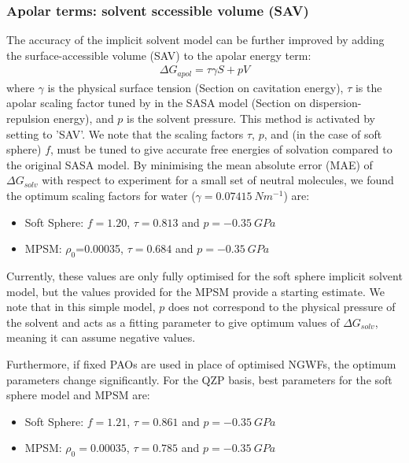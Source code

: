 \documentclass[letterpaper,10pt,english]{sphinxmanual}
\begin{document}
\subsubsection{Apolar terms: solvent sccessible volume (SAV)}
\label{\detokenize{implicit_solvation_v3:apolar-terms-solvent-sccessible-volume-sav}}
The accuracy of the implicit solvent model can be further improved by
adding the surface-accessible volume (SAV) to the apolar energy term:
\begin{equation*}
\begin{split}\Delta G_{apol} = \tau \gamma S + p V\end{split}
\end{equation*}
where \(\gamma\) is the physical surface tension (Section
on cavitation energy), \(\tau\) is the apolar scaling factor tuned by
 in the SASA model (Section
on dispersion-repulsion energy), and \(p\) is the solvent pressure. This method is
activated by setting  to ’SAV’. We note that the
scaling factors \(\tau\), \(p\), and (in the case of soft
sphere) \(f\), must be tuned to give accurate free energies of
solvation compared to the original SASA model. By minimising the mean
absolute error (MAE) of \(\Delta G_{solv}\) with respect to
experiment for a small set of neutral molecules, we found the optimum
scaling factors for water (\(\gamma=0.07415 \ Nm^{-1}\)) are:
\begin{itemize}
\item {} 
Soft Sphere: \(f=1.20\), \(\tau = 0.813\) and
\(p = -0.35 \ GPa\)

\item {} 
MPSM: \(\rho_0\)=0.00035, \(\tau = 0.684\) and
\(p = -0.35 \ GPa\)

\end{itemize}

Currently, these values are only fully optimised for the soft sphere
implicit solvent model, but the values provided for the MPSM provide a
starting estimate. We note that in this simple model, \(p\) does not
correspond to the physical pressure of the solvent and acts as a fitting
parameter to give optimum values of \(\Delta G_{solv}\), meaning it
can assume negative values.

Furthermore, if fixed PAOs are used in place of optimised NGWFs, the
optimum parameters change significantly. For the QZP basis, best
parameters for the soft sphere model and MPSM are:
\begin{itemize}
\item {} 
Soft Sphere: \(f=1.21\), \(\tau=0.861\) and
\(p=-0.35 \ GPa\)

\item {} 
MPSM: \(\rho_0=0.00035\), \(\tau=0.785\) and
\(p=-0.35 \ GPa\)

\end{itemize}
\end{document}
